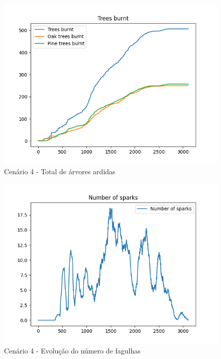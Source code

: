 \begin{figure}[H]
    \centering
    \includegraphics[width=\textwidth]{src/runs/scenario4/trees_burnt.png}
    \caption{Cenário 4 - Total de árvores ardidas}
    \label{fig:S4TreesBurnt}
\end{figure}

\begin{figure}[H]
    \centering
    \includegraphics[width=\textwidth]{src/runs/scenario4/sparks.png}
    \caption{Cenário 4 - Evolução do número de fagulhas}
    \label{fig:S4Sparks}
\end{figure}

